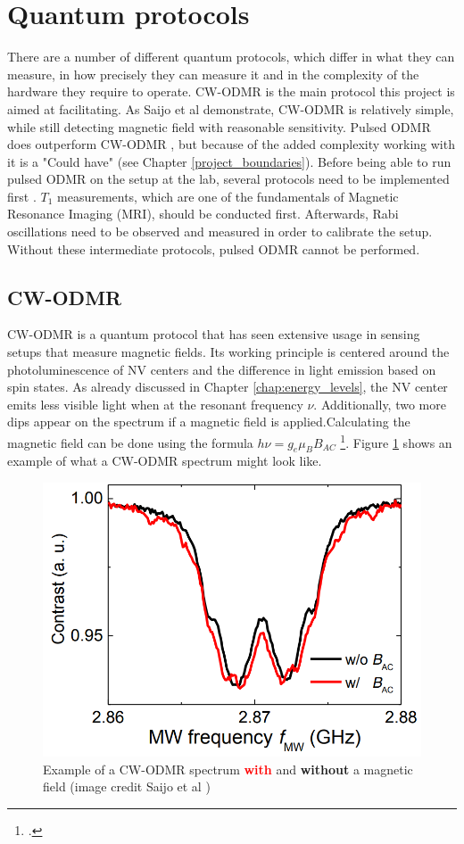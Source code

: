 \section{Quantum protocols}
There are a number of different quantum protocols, which differ in what they can measure, in how precisely they can measure it and in the complexity of the hardware they require to operate. CW-ODMR is the main protocol this project is aimed at facilitating. As Saijo et al \cite{saijo2018ac} demonstrate, CW-ODMR is relatively simple, while still detecting magnetic field with reasonable sensitivity. Pulsed ODMR does outperform CW-ODMR \cite{zhang2020high}, but because of the added complexity working with it is a "Could have" (see Chapter \ref{project_boundaries}). Before being able to run pulsed ODMR on the setup at the lab, several protocols need to be implemented first \cite{sewani2020coherent}. $T_1$ measurements, which are one of the fundamentals of Magnetic Resonance Imaging (MRI), should be conducted first. Afterwards, Rabi oscillations need to be observed and measured in order to calibrate the setup. Without these intermediate protocols, pulsed ODMR cannot be performed.



\subsection{CW-ODMR}
CW-ODMR is a quantum protocol that has seen extensive usage in sensing setups that measure magnetic fields. Its working principle is centered around the photoluminescence of NV centers and the difference in light emission based on spin states. As already discussed in Chapter \ref{chap:energy_levels}, the NV center emits less visible light when at the resonant frequency $\nu$. Additionally, two more dips appear on the spectrum if a magnetic field is applied.Calculating the magnetic field can be done using the formula $h\nu = g_e\mu_BB_{AC}$ \footcite[In the formula, $h$ is the Planck constant, $g_e$ is the g-factor of the electron and $\mu_B$ is the Bohr magneton. Knowing all other variables, $B_{AC}$ can easily be calculated.]{enwiki:1301371272}. Figure \ref{fig:cwodmr} shows an example of what a CW-ODMR spectrum might look like. 

\begin{figure}[ht]
	\centering
	\includegraphics[width=0.7\linewidth]{img/cw_odmr}
	\caption{Example of a CW-ODMR spectrum \textbf{\textcolor{red}{with}} and \textbf{without} a magnetic field (image credit Saijo et al \cite{saijo2018ac})}
	\label{fig:cwodmr}
\end{figure}



